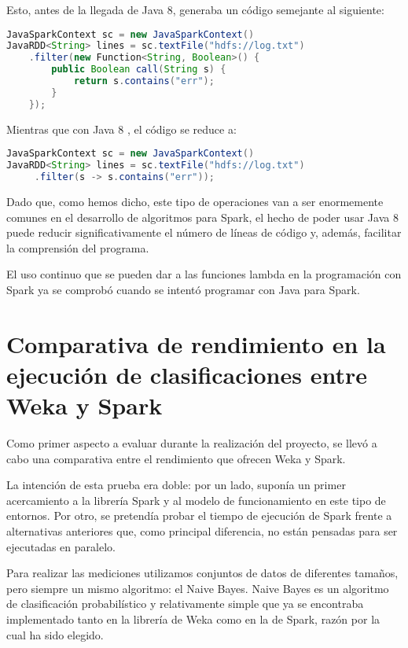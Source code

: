 Esto, antes de la llegada de Java 8, generaba un código semejante al siguiente:

\begin{lstlisting}[language=Java,tabsize=4,frame = single,caption=Código de función lambda en Java 7 \cite{Java7vs8},captionpos=b,]
JavaSparkContext sc = new JavaSparkContext()
JavaRDD<String> lines = sc.textFile("hdfs://log.txt")
	.filter(new Function<String, Boolean>() {
		public Boolean call(String s) {
			return s.contains("err");
		}
	});
\end{lstlisting}

Mientras que con Java 8 , el código se reduce a:

\begin{lstlisting}[language=Java,tabsize=4,frame = single,caption=Código de función lambda en Java 8 \cite{Java7vs8},captionpos=b,]
JavaSparkContext sc = new JavaSparkContext()
JavaRDD<String> lines = sc.textFile("hdfs://log.txt")
     .filter(s -> s.contains("err"));
\end{lstlisting}

Dado que, como hemos dicho, este tipo de operaciones van a ser enormemente comunes en el desarrollo de algoritmos para Spark, el hecho de poder usar Java 8 puede reducir significativamente el número de líneas de código y, además, facilitar la comprensión del programa.

El uso continuo que se pueden dar a las funciones lambda en la programación con Spark ya se comprobó cuando se intentó programar con Java para Spark.


\section{Comparativa de rendimiento en la ejecución de clasificaciones entre Weka y Spark}

Como primer aspecto a evaluar durante la realización del proyecto, se llevó a cabo una comparativa entre el rendimiento que ofrecen Weka y Spark.

La intención de esta prueba era doble: por un lado, suponía un primer acercamiento a la librería Spark y al modelo de funcionamiento en este tipo de entornos. Por otro, se pretendía probar el tiempo de ejecución de Spark frente a alternativas anteriores que, como principal diferencia, no están pensadas para ser ejecutadas en paralelo.

Para realizar las mediciones utilizamos conjuntos de datos de diferentes tamaños, pero siempre un mismo algoritmo: el Naive Bayes. Naive Bayes es un algoritmo de clasificación probabilístico y relativamente simple que ya se encontraba implementado tanto en la librería de Weka como en la de Spark, razón por la cual ha sido elegido.

